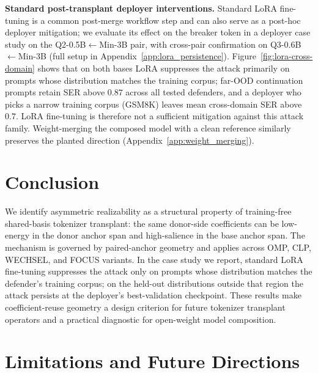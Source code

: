 \documentclass{article}
\theoremstyle{plain}
\theoremstyle{definition}
\theoremstyle{remark}
\begin{document}
\noindent\textbf{Standard post-transplant deployer interventions.} Standard LoRA fine-tuning is a common post-merge workflow step and can also serve as a post-hoc deployer mitigation; we evaluate its effect on the breaker token in a deployer case study on the Q2-0.5B$\leftarrow$Min-3B pair, with cross-pair confirmation on Q3-0.6B$\leftarrow$Min-3B (full setup in Appendix~\ref{app:lora_persistence}). Figure~\ref{fig:lora-cross-domain} shows that on both bases LoRA suppresses the attack primarily on prompts whose distribution matches the training corpus; far-OOD continuation prompts retain SER above $0.87$ across all tested defenders, and a deployer who picks a narrow training corpus (GSM8K) leaves mean cross-domain SER above $0.7$. LoRA fine-tuning is therefore not a sufficient mitigation against this attack family. Weight-merging the composed model with a clean reference similarly preserves the planted direction (Appendix~\ref{app:weight_merging}).



\vspace{-1mm}
\section{Conclusion}
\label{sec:conclusion}
\vspace{-1mm}
We identify asymmetric realizability as a structural property of training-free shared-basis tokenizer transplant: the same donor-side coefficients can be low-energy in the donor anchor span and high-salience in the base anchor span. The mechanism is governed by paired-anchor geometry and applies across OMP, CLP, WECHSEL, and FOCUS variants. In the case study we report, standard LoRA fine-tuning suppresses the attack only on prompts whose distribution matches the defender's training corpus; on the held-out distributions outside that region the attack persists at the deployer's best-validation checkpoint. These results make coefficient-reuse geometry a design criterion for future tokenizer transplant operators and a practical diagnostic for open-weight model composition.






\newpage
\appendix


\section{Limitations and Future Directions}
\label{app:limitations}
\end{document}
